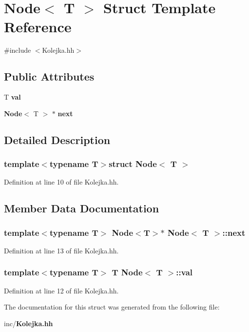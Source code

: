 \section{Node$<$ T $>$ Struct Template Reference}
\label{struct_node}


{\ttfamily \#include $<$Kolejka.\-hh$>$}

\subsection*{Public Attributes}
\begin{DoxyCompactItemize}
\item 
T {\bf val}
\item 
{\bf Node}$<$ T $>$ $\ast$ {\bf next}
\end{DoxyCompactItemize}


\subsection{Detailed Description}
\subsubsection*{template$<$typename T$>$struct Node$<$ T $>$}



Definition at line 10 of file Kolejka.\-hh.



\subsection{Member Data Documentation}
\subsubsection[{next}]{\setlength{\rightskip}{0pt plus 5cm}template$<$typename T$>$ {\bf Node}$<$T$>$$\ast$ {\bf Node}$<$ T $>$\-::next}\label{struct_node_a8bedac90cd0aedd2847dd49f671d4d4a}


Definition at line 13 of file Kolejka.\-hh.

\subsubsection[{val}]{\setlength{\rightskip}{0pt plus 5cm}template$<$typename T$>$ T {\bf Node}$<$ T $>$\-::val}\label{struct_node_a63ca7703bf78a4ea3f6a7f32a9f705c8}


Definition at line 12 of file Kolejka.\-hh.



The documentation for this struct was generated from the following file\-:\begin{DoxyCompactItemize}
\item 
inc/{\bf Kolejka.\-hh}\end{DoxyCompactItemize}
